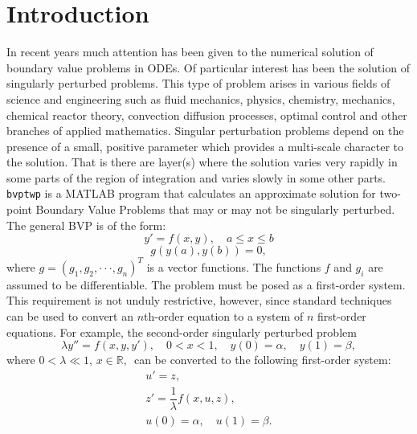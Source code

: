 \documentclass{article}
\begin{document}
\section{Introduction}\label{intro}
In recent years much attention has been given to the numerical solution of boundary
value problems in ODEs. Of particular interest has been the solution of  singularly perturbed
problems. This type of problem arises in various fields of science and engineering such as fluid
mechanics, physics, chemistry, mechanics, chemical reactor theory, convection diffusion processes, 
optimal control and other branches of applied mathematics. Singular perturbation problems depend on 
the presence of a small, positive parameter which provides a multi-scale character to the solution. That is
there are layer(s) where the solution varies very rapidly in some parts of the region of integration and varies
slowly in some other parts. \texttt{bvptwp} is a MATLAB program that calculates an approximate solution for
two-point Boundary Value Problems that may or may not be singularly perturbed.
The general BVP is of the form:
\begin{equation}\label{bvp1}
y'=f(x,y),  \quad    a \leq  x \leq b
\end{equation}
\begin{equation}\label{bvp2}
g(y(a),y(b)) = 0,
\end{equation}
where $ g = ( g_{1}, g_{2},\cdot\cdot\cdot,g_{n})^{T}$ is a vector functions.
The functions $f$ and $g_{i}$ are assumed to be differentiable.
The problem must be posed as a first-order system. This requirement is not unduly restrictive,
however, since standard techniques can be used to convert an $n$th-order equation to a system
of $n$ first-order equations. For example, the second-order   singularly
perturbed  problem
\begin{equation}
 \lambda y''=f(x,y,y'),\quad 0 < x < 1, \quad y(0) = \alpha, \quad y(1) = \beta,
\end{equation}
where $0 <\lambda \ll 1,\, x \in \mathbb{R},\,$
can be converted to the following first-order system:
\begin{equation*}
\begin{array}{l}
u' = z, \\
z' = \dfrac{1}{\lambda}f(x,u,z), \\
 u(0) = \alpha, \quad u(1) = \beta.\\
\end{array}
\end{equation*}
\end{document}
